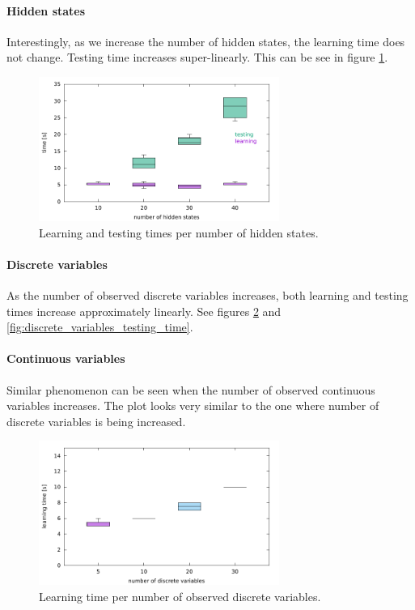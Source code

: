 \documentclass[thesis=B,english]{FITthesis}[2012/06/26]
\begin{document}
\paragraph{Hidden states}

Interestingly, as we increase the number of hidden states, the learning time does not change. Testing time increases super-linearly. This can be see in figure \ref{fig:hidden_states_learning_testing_time}.

\begin{figure}
	\centering
 	\includegraphics[width=0.7\textwidth]{hidden_states_learning_testing_time}
 	\caption{Learning and testing times per number of hidden states.}
 	\label{fig:hidden_states_learning_testing_time}
\end{figure}

\paragraph{Discrete variables}

As the number of observed discrete variables increases, both learning and testing times increase approximately linearly. See figures \ref{fig:discrete_variables_learning_time} and \ref{fig:discrete_variables_testing_time}.

\paragraph{Continuous variables}

Similar phenomenon can be seen when the number of observed continuous variables increases. The plot looks very similar to the one where number of discrete variables is being increased.

\begin{figure}
	\centering
 	\includegraphics[width=0.7\textwidth]{discrete_variables_learning_time}
 	\caption{Learning time per number of observed discrete variables.}
 	\label{fig:discrete_variables_learning_time}
\end{figure}
\end{document}
